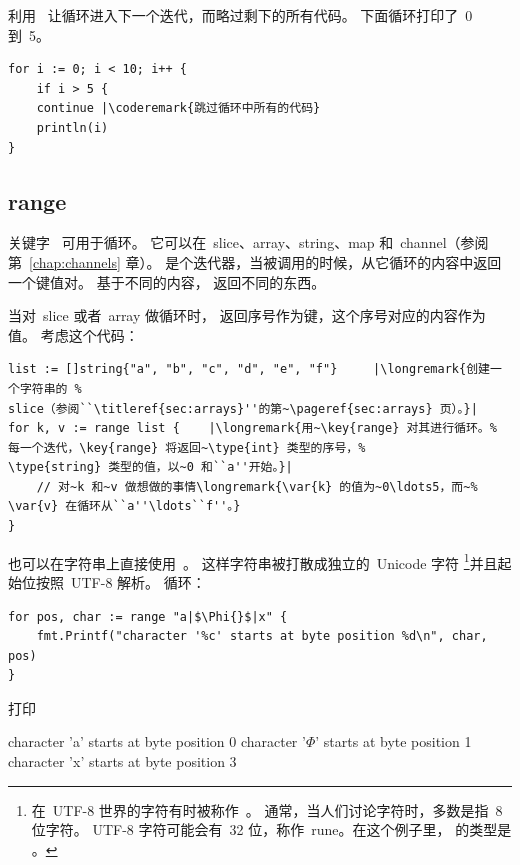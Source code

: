 利用~ 让循环进入下一个迭代，而略过剩下的所有代码。
下面循环打印了~0 到~5。
\begin{lstlisting}
for i := 0; i < 10; i++ {
    if i > 5 {
	continue |\coderemark{跳过循环中所有的代码}
    println(i)
}
\end{lstlisting}

\subsection{range}
关键字~ 可用于循环。
它可以在~slice、array、string、map 和~channel（参阅第~\ref{chap:channels} 章）。
 是个迭代器，当被调用的时候，从它循环的内容中返回一个键值对。
基于不同的内容， 返回不同的东西。

当对~slice 或者~array 做循环时， 返回序号作为键，这个序号对应的内容作为值。
考虑这个代码：
\begin{lstlisting}
list := []string{"a", "b", "c", "d", "e", "f"}     |\longremark{创建一个字符串的 %
slice（参阅``\titleref{sec:arrays}''的第~\pageref{sec:arrays} 页）。}|
for k, v := range list {	|\longremark{用~\key{range} 对其进行循环。%
每一个迭代，\key{range} 将返回~\type{int} 类型的序号，%
\type{string} 类型的值，以~0 和``a''开始。}|
    // 对~k 和~v 做想做的事情\longremark{\var{k} 的值为~0\ldots5，而~%
\var{v} 在循环从``a''\ldots``f''。}
}
\end{lstlisting}
\showremarks

也可以在字符串上直接使用~。
这样字符串被打散成独立的~Unicode 字符
\footnote{在~UTF-8 世界的字符有时被称作~。
通常，当人们讨论字符时，多数是指~8 位字符。
UTF-8 字符可能会有~32 位，称作~rune。在这个例子里， 的类型是 。}并且起始位按照~UTF-8 解析。
循环：
\begin{lstlisting}
for pos, char := range "a|$\Phi{}$|x" {
    fmt.Printf("character '%c' starts at byte position %d\n", char, pos)
}
\end{lstlisting}
打印
\begin{display}
character 'a' starts at byte position 0
character '\begin{math}\Phi\end{math}' starts at byte position 1
character 'x' starts at byte position 3 
\end{display}

